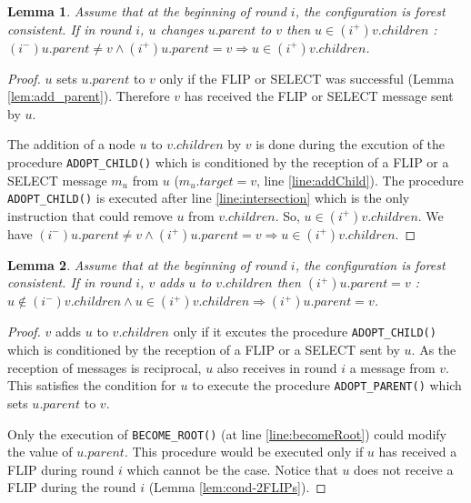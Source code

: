 \documentclass[twocolumn]{article}
\newtheorem{lemma}{Lemma}
\newcommand{\depends}[1]{}
\newcommand{\state}[3]{\ensuremath{(#2^{#3})#1}}
\newcommand{\uim}{\state{u}{i}{-}}
\newcommand{\vim}{\state{v}{i}{-}}
\newcommand{\uip}{\state{u}{i}{+}}
\newcommand{\vip}{\state{v}{i}{+}}
\begin{document}
\begin{lemma}
 \label{lem:add_parent_add_child}
Assume that at the beginning of round $i$, the configuration is forest consistent. If in round $i$, $u$ changes $u.parent$ to $v$ then 
$u \in \vip.children$ : 
$\uim.parent \neq v \wedge \uip.parent = v \Rightarrow u \in \vip.children$.
\end{lemma}
\begin{proof}
$u$ sets $u.parent$ to $v$ only if the FLIP or SELECT was successful 
(Lemma \ref{lem:add_parent}). 
Therefore $v$ has received the FLIP or SELECT message sent by $u$.
 
The addition of a node $u$ to $v.children$ by $v$ is done during
the excution of the procedure \texttt{ADOPT\_CHILD()} which is 
conditioned by the reception of a FLIP or a SELECT message $m_u$ from $u$  
($m_u.target=v$, line \ref{line:addChild}). 
The procedure \texttt{ADOPT\_CHILD()} is executed after line \ref{line:intersection}
which is the only instruction that could remove $u$ from $v.children$. 
So, $u \in \vip.children$. 
We have $\uim.parent \neq v \wedge \uip.parent = v 
\Rightarrow u \in \vip.children$.
 \end{proof}




\begin{lemma}
  \label{lem:add_child_add_parent}
Assume that at the beginning of round $i$, the configuration is forest consistent. If in round $i$, $v$ adds $u$ to $v.children$ then $\uip.parent = v$ : $u \not \in \vim.children \wedge u \in \vip.children \Rightarrow \uip.parent = v$.
\depends{\ref{lem:cond-2FLIPs}}
\end{lemma}
\begin{proof}
 $v$ adds $u$ to $v.children$ only if it excutes the procedure 
\texttt{ADOPT\_CHILD()}
 which is conditioned by the reception of a FLIP or a SELECT 
sent by $u$.
As the reception of messages is reciprocal, 
$u$ also receives in round $i$ a message from $v$. This satisfies the condition for $u$ to execute the procedure 
\texttt{ADOPT\_PARENT()} which sets $u.parent$ to $v$.



Only the execution of \texttt{BECOME\_ROOT()} (at line \ref{line:becomeRoot}) 
could modify the value of $u.parent$.
This procedure would be executed only if $u$ has received
 a FLIP during round $i$ which cannot be the case.
 Notice that $u$ does not receive a FLIP during the round $i$ (Lemma \ref{lem:cond-2FLIPs}).
 \end{proof}
\end{document}
